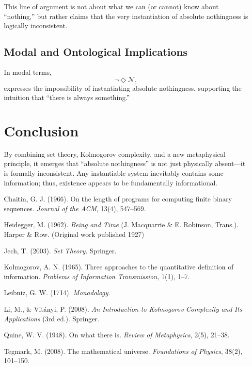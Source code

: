 \documentclass[12pt,a4paper]{article}
\begin{document}
This line of argument is not about what we can (or cannot) know about ``nothing,'' but rather claims that the very instantiation of absolute nothingness is logically inconsistent.

\subsection{Modal and Ontological Implications}

In modal terms,
\[
\neg \Diamond \mathcal{N},
\]
expresses the impossibility of instantiating absolute nothingness, supporting the intuition that ``there is always something.''

\section{Conclusion}

By combining set theory, Kolmogorov complexity, and a new metaphysical principle, it emerges that ``absolute nothingness'' is not just physically absent—it is formally inconsistent. Any instantiable system inevitably contains some information; thus, existence appears to be fundamentally informational.

\begin{thebibliography}{99}

Chaitin, G. J. (1966). On the length of programs for computing finite binary sequences. \emph{Journal of the ACM}, 13(4), 547--569.

Heidegger, M. (1962). \emph{Being and Time} (J. Macquarrie \& E. Robinson, Trans.). Harper \& Row. (Original work published 1927)

Jech, T. (2003). \emph{Set Theory}. Springer.

Kolmogorov, A. N. (1965). Three approaches to the quantitative definition of information. \emph{Problems of Information Transmission}, 1(1), 1--7.

Leibniz, G. W. (1714). \emph{Monadology}.

Li, M., \& Vitányi, P. (2008). \emph{An Introduction to Kolmogorov Complexity and Its Applications} (3rd ed.). Springer.

Quine, W. V. (1948). On what there is. \emph{Review of Metaphysics}, 2(5), 21--38.

Tegmark, M. (2008). The mathematical universe. \emph{Foundations of Physics}, 38(2), 101--150.

\end{thebibliography}
\end{document}
